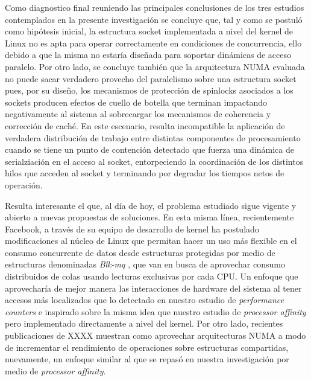 \begin{conclusion}
 
Como diagnostico final reuniendo las principales conclusiones de los tres estudios contemplados en la presente investigación se concluye que, tal y como se postuló como hipótesis inicial, la estructura socket implementada a nivel del kernel de Linux no es apta para operar correctamente en condiciones de concurrencia, ello debido a que la misma no estaría diseñada para soportar dinámicas de acceso paralelo. Por otro lado, se concluye también que la arquitectura NUMA evaluada no puede sacar verdadero provecho del paralelismo sobre una estructura socket pues, por su diseño, los mecanismos de protección de spinlocks asociados a los sockets producen efectos de cuello de botella que terminan impactando negativamente al sistema al sobrecargar los mecanismos de coherencia y corrección de caché. En este escenario, resulta incompatible la aplicación de verdadera distribución de trabajo entre distintas componentes de procesamiento cuando se tiene un punto de contención detectado que fuerza una dinámica de serialziación en el acceso al socket, entorpeciendo la coordinación de los distintos hilos que acceden al socket y terminando por degradar los tiempos netos de operación. 
 
 
Resulta interesante el que, al día de hoy, el problema estudiado sigue vigente y abierto a nuevas propuestas de soluciones. En esta misma línea, recientemente Facebook, a través de su equipo de desarrollo de kernel ha postulado modificaciones al núcleo de Linux que permitan hacer un uso más flexible en el consumo concurrente de datos desde estructuras protegidas por medio de estructuras denominadas \emph{Blk-mq} \cite{post:facebookFin}, que van en busca de aprovechar consumo distribuidos de colas usando lecturas exclusivas por cada CPU. Un enfoque que aprovecharía de mejor manera las interacciones de hardware del sistema al tener accesos más localizados que lo detectado en nuestro estudio de \emph{performance counters} e inspirado sobre la misma idea que nuestro estudio de \emph{processor affinity} pero implementado directamente a nivel del kernel. Por otro lado, recientes publicaciones de XXXX muestran como aprovechar arquitecturas NUMA a modo de incrementar el rendimiento de operaciones sobre estructuras compartidas, nuevamente, un enfoque similar al que se repasó en nuestra investigación por medio de \emph{processor affinity}. 
 

\end{conclusion}
